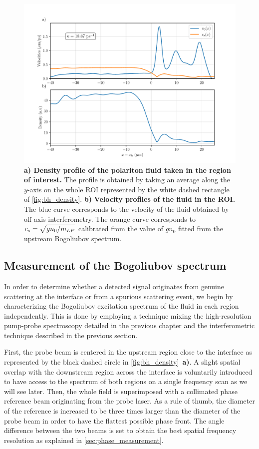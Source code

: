 \begin{figure}
    \centering
    \includegraphics[width=1\textwidth]{chap_stimulated_hawking/fig/bh_balistic.pdf}
    \caption{\textbf{a) Density profile of the polariton fluid taken in the region of interest.} The profile is obtained by taking an
    average along the $y$-axis on the whole ROI represented by the white dashed rectangle of \autoref{fig:bh_density}. \textbf{b)} \textbf{Velocity profiles of the fluid in the ROI.} The blue curve corresponds to the velocity of the fluid obtained by off axis interferometry. The orange
    curve corresponds to $c_s=\sqrt{gn_0/m_{LP}}$ calibrated from the value of $gn_0$ fitted from the upstream Bogoliubov spectrum.}
    \label{fig:bh_balistic}
\end{figure}

\subsection{Measurement of the Bogoliubov spectrum}

In order to determine whether a detected signal originates from genuine scattering at the interface or from a spurious scattering event, we begin by characterizing the Bogoliubov excitation spectrum of the fluid in each region independently.
This is done by employing a technique mixing the high-resolution pump-probe spectroscopy detailed in the previous chapter and the interferometric technique described in the previous section.

\bigskip

First, the probe beam is centered in the upstream region close to the interface as represented by the black dashed circle in \autoref{fig:bh_density}~\textbf{a)}.
A slight spatial overlap with the downstream region across the interface is voluntarily introduced to have access to the spectrum of both regions on a single frequency scan as we will see later. 
Then, the whole field is superimposed with a collimated phase reference beam originating from the probe laser. As a rule of thumb, the diameter of the reference is increased to be three times larger than the diameter of the probe beam in order to have the flattest possible phase front.
 The angle difference between the two beams is set to obtain the best spatial frequency resolution as explained in \autoref{sec:phase_measurement}.


